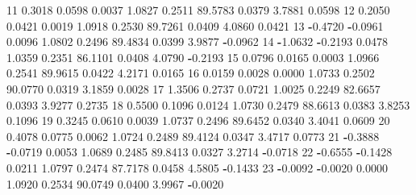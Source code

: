 \documentclass[
]{book}
\newenvironment{Shaded}{\begin{snugshade}}{\end{snugshade}}
\newcommand{\DecValTok}[1]{\textcolor[rgb]{0.00,0.00,0.81}{#1}}
\newcommand{\FloatTok}[1]{\textcolor[rgb]{0.00,0.00,0.81}{#1}}
\newcommand{\SpecialCharTok}[1]{\textcolor[rgb]{0.81,0.36,0.00}{\textbf{#1}}}
\begin{document}
\begin{Shaded}
\begin{Highlighting}[]
\DecValTok{11}   \FloatTok{0.3018}  \FloatTok{0.0598} \FloatTok{0.0037} \FloatTok{1.0827}   \FloatTok{0.2511} \FloatTok{89.5783} \FloatTok{0.0379} \FloatTok{3.7881}  \FloatTok{0.0598}     
\DecValTok{12}   \FloatTok{0.2050}  \FloatTok{0.0421} \FloatTok{0.0019} \FloatTok{1.0918}   \FloatTok{0.2530} \FloatTok{89.7261} \FloatTok{0.0409} \FloatTok{4.0860}  \FloatTok{0.0421}     
\DecValTok{13}  \SpecialCharTok{{-}}\FloatTok{0.4720} \SpecialCharTok{{-}}\FloatTok{0.0961} \FloatTok{0.0096} \FloatTok{1.0802}   \FloatTok{0.2496} \FloatTok{89.4834} \FloatTok{0.0399} \FloatTok{3.9877} \SpecialCharTok{{-}}\FloatTok{0.0962}     
\DecValTok{14}  \SpecialCharTok{{-}}\FloatTok{1.0632} \SpecialCharTok{{-}}\FloatTok{0.2193} \FloatTok{0.0478} \FloatTok{1.0359}   \FloatTok{0.2351} \FloatTok{86.1101} \FloatTok{0.0408} \FloatTok{4.0790} \SpecialCharTok{{-}}\FloatTok{0.2193}     
\DecValTok{15}   \FloatTok{0.0796}  \FloatTok{0.0165} \FloatTok{0.0003} \FloatTok{1.0966}   \FloatTok{0.2541} \FloatTok{89.9615} \FloatTok{0.0422} \FloatTok{4.2171}  \FloatTok{0.0165}     
\DecValTok{16}   \FloatTok{0.0159}  \FloatTok{0.0028} \FloatTok{0.0000} \FloatTok{1.0733}   \FloatTok{0.2502} \FloatTok{90.0770} \FloatTok{0.0319} \FloatTok{3.1859}  \FloatTok{0.0028}     
\DecValTok{17}   \FloatTok{1.3506}  \FloatTok{0.2737} \FloatTok{0.0721} \FloatTok{1.0025}   \FloatTok{0.2249} \FloatTok{82.6657} \FloatTok{0.0393} \FloatTok{3.9277}  \FloatTok{0.2735}     
\DecValTok{18}   \FloatTok{0.5500}  \FloatTok{0.1096} \FloatTok{0.0124} \FloatTok{1.0730}   \FloatTok{0.2479} \FloatTok{88.6613} \FloatTok{0.0383} \FloatTok{3.8253}  \FloatTok{0.1096}     
\DecValTok{19}   \FloatTok{0.3245}  \FloatTok{0.0610} \FloatTok{0.0039} \FloatTok{1.0737}   \FloatTok{0.2496} \FloatTok{89.6452} \FloatTok{0.0340} \FloatTok{3.4041}  \FloatTok{0.0609}     
\DecValTok{20}   \FloatTok{0.4078}  \FloatTok{0.0775} \FloatTok{0.0062} \FloatTok{1.0724}   \FloatTok{0.2489} \FloatTok{89.4124} \FloatTok{0.0347} \FloatTok{3.4717}  \FloatTok{0.0773}     
\DecValTok{21}  \SpecialCharTok{{-}}\FloatTok{0.3888} \SpecialCharTok{{-}}\FloatTok{0.0719} \FloatTok{0.0053} \FloatTok{1.0689}   \FloatTok{0.2485} \FloatTok{89.8413} \FloatTok{0.0327} \FloatTok{3.2714} \SpecialCharTok{{-}}\FloatTok{0.0718}     
\DecValTok{22}  \SpecialCharTok{{-}}\FloatTok{0.6555} \SpecialCharTok{{-}}\FloatTok{0.1428} \FloatTok{0.0211} \FloatTok{1.0797}   \FloatTok{0.2474} \FloatTok{87.7178} \FloatTok{0.0458} \FloatTok{4.5805} \SpecialCharTok{{-}}\FloatTok{0.1433}     
\DecValTok{23}  \SpecialCharTok{{-}}\FloatTok{0.0092} \SpecialCharTok{{-}}\FloatTok{0.0020} \FloatTok{0.0000} \FloatTok{1.0920}   \FloatTok{0.2534} \FloatTok{90.0749} \FloatTok{0.0400} \FloatTok{3.9967} \SpecialCharTok{{-}}\FloatTok{0.0020}     

\end{Highlighting}
\end{Shaded}
\end{document}
